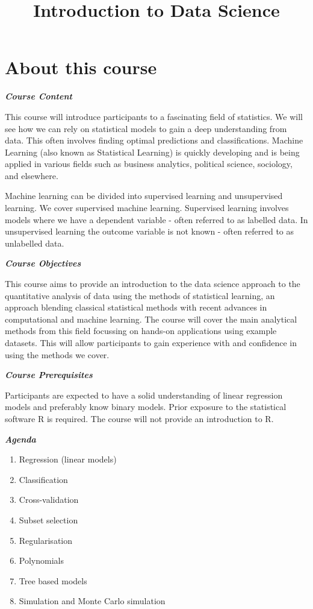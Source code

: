 \documentclass[]{article}
\title{Introduction to Data Science}
\author{}
\date{}
\providecommand{\tightlist}{%
  \setlength{\itemsep}{0pt}\setlength{\parskip}{0pt}}
\begin{document}
\maketitle

{
\setcounter{tocdepth}{2}
\tableofcontents
}
\hypertarget{about-this-course}{%
\section*{About this course}\label{about-this-course}}

\textbf{\emph{Course Content}}

This course will introduce participants to a fascinating field of statistics. We will see how we can rely on statistical models to gain a deep understanding from data. This often involves finding optimal predictions and classifications. Machine Learning (also known as Statistical Learning) is quickly developing and is being applied in various fields such as business analytics, political science, sociology, and elsewhere.

Machine learning can be divided into supervised learning and unsupervised learning. We cover supervised machine learning. Supervised learning involves models where we have a dependent variable - often referred to as labelled data. In unsupervised learning the outcome variable is not known - often referred to as unlabelled data.

\textbf{\emph{Course Objectives}}

This course aims to provide an introduction to the data science approach to the quantitative analysis of data using the methods of statistical learning, an approach blending classical statistical methods with recent advances in computational and machine learning. The course will cover the main analytical methods from this field focussing on hands-on applications using example datasets. This will allow participants to gain experience with and confidence in using the methods we cover.

\textbf{\emph{Course Prerequisites}}

Participants are expected to have a solid understanding of linear regression models and preferably know binary models. Prior exposure to the statistical software R is required. The course will not provide an introduction to R.

\textbf{\emph{Agenda}}

\begin{enumerate}
\def\labelenumi{\arabic{enumi}.}
\tightlist
\item
  Regression (linear models)
\item
  Classification
\item
  Cross-validation
\item
  Subset selection
\item
  Regularisation
\item
  Polynomials
\item
  Tree based models
\item
  Simulation and Monte Carlo simulation
\end{enumerate}
\end{document}

